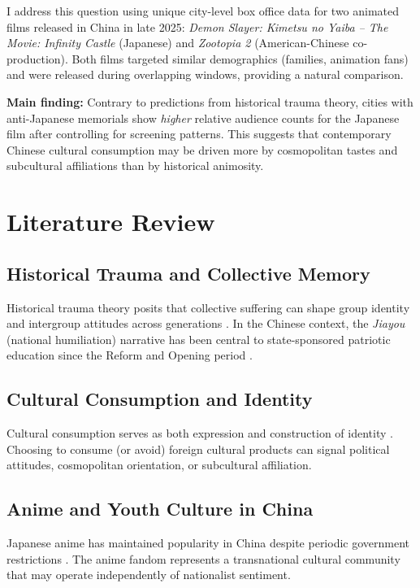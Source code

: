 \documentclass[12pt]{article}
\begin{document}
I address this question using unique city-level box office data for two animated films released in China in late 2025: \textit{Demon Slayer: Kimetsu no Yaiba -- The Movie: Infinity Castle} (Japanese) and \textit{Zootopia 2} (American-Chinese co-production). Both films targeted similar demographics (families, animation fans) and were released during overlapping windows, providing a natural comparison.

\textbf{Main finding:} Contrary to predictions from historical trauma theory, cities with anti-Japanese memorials show \textit{higher} relative audience counts for the Japanese film after controlling for screening patterns. This suggests that contemporary Chinese cultural consumption may be driven more by cosmopolitan tastes and subcultural affiliations than by historical animosity.

\section{Literature Review}

\subsection{Historical Trauma and Collective Memory}

Historical trauma theory posits that collective suffering can shape group identity and intergroup attitudes across generations \citep{weisberg2009historical}. In the Chinese context, the \textit{Jiayou} (national humiliation) narrative has been central to state-sponsored patriotic education since the Reform and Opening period \citep{wong2008patriotic}.

\subsection{Cultural Consumption and Identity}

Cultural consumption serves as both expression and construction of identity \citep{bourdieu1984distinction}. Choosing to consume (or avoid) foreign cultural products can signal political attitudes, cosmopolitan orientation, or subcultural affiliation.

\subsection{Anime and Youth Culture in China}

Japanese anime has maintained popularity in China despite periodic government restrictions \citep{tsuji2017anime}. The anime fandom represents a transnational cultural community that may operate independently of nationalist sentiment.
\end{document}
